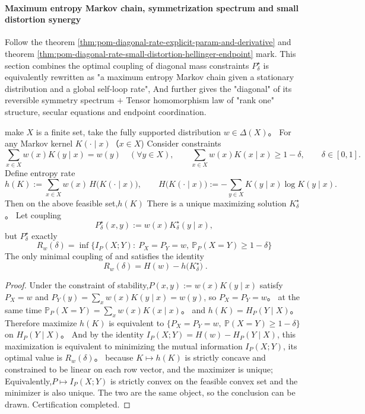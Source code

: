 
\paragraph{Maximum entropy Markov chain, symmetrization spectrum and small distortion synergy}
Follow the theorem \ref{thm:pom-diagonal-rate-explicit-param-and-derivative} and theorem \ref{thm:pom-diagonal-rate-small-distortion-hellinger-endpoint} mark.
This section combines the optimal coupling of diagonal mass constraints \(P^\star_\delta\) is equivalently rewritten as "a maximum entropy Markov chain given a stationary distribution and a global self-loop rate",
And further gives the "diagonal" of its reversible symmetry spectrum \(+\) Tensor homomorphism law of "rank one" structure, secular equations and endpoint coordination.

\begin{theorem}\label{thm:pom-maxent-markov-unique-optimal-kernel}
make \(X\) is a finite set, take the fully supported distribution \(w\in\Delta(X)\)。
For any Markov kernel \(K(\cdot\mid x)\)（\(x\in X\)) Consider constraints
\[
\sum_{x\in X}w(x)K(y\mid x)=w(y)\quad(\forall y\in X),
\qquad
\sum_{x\in X}w(x)K(x\mid x)\ge 1-\delta,\qquad \delta\in[0,1].
\]
Define entropy rate
\[
h(K):=\sum_{x\in X}w(x)\,H\!\bigl(K(\cdot\mid x)\bigr),
\qquad
H\!\bigl(K(\cdot\mid x)\bigr):=-\sum_{y\in X}K(y\mid x)\log K(y\mid x).
\]
Then on the above feasible set,\(h(K)\) There is a unique maximizing solution \(K^\star_\delta\)。
Let coupling
\[
P^\star_\delta(x,y):=w(x)K^\star_\delta(y\mid x),
\]
but \(P^\star_\delta\) exactly
\[
R_w(\delta)=\inf\{I_P(X;Y):\ P_X=P_Y=w,\ \mathbb P_P(X=Y)\ge 1-\delta\}
\]
The only minimal coupling of and satisfies the identity
\[
\boxed{\;
R_w(\delta)=H(w)-h\!\bigl(K^\star_\delta\bigr)\; }.
\]
\end{theorem}
\begin{proof}
Under the constraint of stability,\(P(x,y):=w(x)K(y\mid x)\) satisfy \(P_X=w\) and
\(
P_Y(y)=\sum_x w(x)K(y\mid x)=w(y)
\), so \(P_X=P_Y=w\)。
at the same time
\(
\mathbb P_P(X=Y)=\sum_x w(x)K(x\mid x)
\)。
and
\(
h(K)=H_P(Y\mid X)
\)。
Therefore maximize \(h(K)\) is equivalent to \(\{P_X=P_Y=w,\ \mathbb P(X=Y)\ge 1-\delta\}\) on \(H_P(Y\mid X)\)。
And by the identity
\(
I_P(X;Y)=H(w)-H_P(Y\mid X)
\), this maximization is equivalent to minimizing the mutual information \(I_P(X;Y)\), its optimal value is \(R_w(\delta)\)。
because \(K\mapsto h(K)\) is strictly concave and constrained to be linear on each row vector, and the maximizer is unique;
Equivalently,\(P\mapsto I_P(X;Y)\) is strictly convex on the feasible convex set and the minimizer is also unique.
The two are the same object, so the conclusion can be drawn. Certification completed.
\end{proof}

